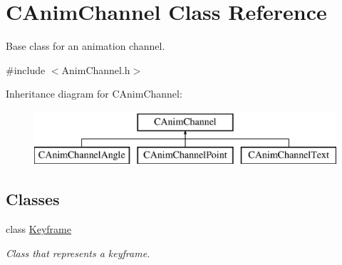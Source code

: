 \hypertarget{class_c_anim_channel}{\section{C\+Anim\+Channel Class Reference}
\label{class_c_anim_channel}
}


Base class for an animation channel.  




{\ttfamily \#include $<$Anim\+Channel.\+h$>$}

Inheritance diagram for C\+Anim\+Channel\+:\begin{figure}[H]
\begin{center}
\leavevmode
\includegraphics[height=2.000000cm]{class_c_anim_channel}
\end{center}
\end{figure}
\subsection*{Classes}
\begin{DoxyCompactItemize}
\item 
class \hyperlink{class_c_anim_channel_1_1_keyframe}{Keyframe}
\begin{DoxyCompactList}\small\item\em Class that represents a keyframe. \end{DoxyCompactList}\end{DoxyCompactItemize}
